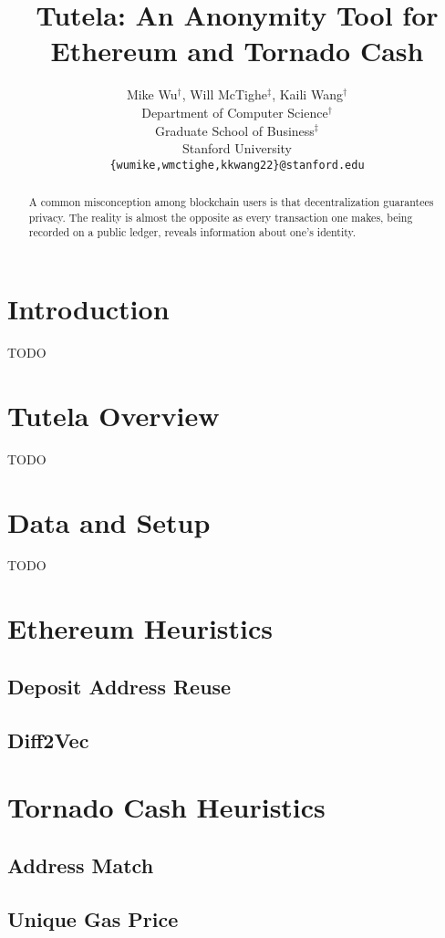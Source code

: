 \documentclass[11pt,a4paper]{article}
\title{Tutela: An Anonymity Tool for Ethereum and Tornado Cash}
\author{Mike Wu$^\dagger$, Will McTighe$^\ddagger$, Kaili Wang$^\dagger$ \\
  Department of Computer Science$^\dagger$ \\
  Graduate School of Business$^\ddagger$ \\
  Stanford University \\
  \texttt{\{wumike,wmctighe,kkwang22\}@stanford.edu} \\}
\date{}
\begin{document}
\maketitle
\begin{abstract}
A common misconception among blockchain users is that decentralization guarantees privacy. The reality is almost the opposite as every transaction one makes, being recorded on a public ledger, reveals information about one's identity.
\end{abstract}

\section{Introduction}

TODO

\section{Tutela Overview}

TODO

\section{Data and Setup}

TODO

\section{Ethereum Heuristics}

\subsection{Deposit Address Reuse}

\subsection{Diff2Vec}

\section{Tornado Cash Heuristics}

\subsection{Address Match}

\subsection{Unique Gas Price}
\end{document}
